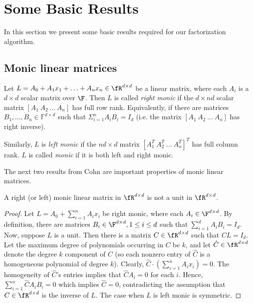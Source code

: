 \section{Some Basic Results}\label{bas-res-sec}

In this section we present some basic results required for our
factorization algorithm.


%

\subsection*{Monic linear matrices}

\begin{definition}\label{def-monic}{\rm\cite{Cohnfir}}
Let $L=A_0+A_1x_1+ \ldots + A_nx_n\in\fR^{d\times d}$ be a linear
matrix, where each $A_i$ is a $d\times d$ scalar matrix over
$\F$. Then $L$ is called \emph{right monic} if the $d\times nd$ scalar
matrix $[A_1~A_2~\ldots~A_n]$ has full row rank. Equivalently, if
there are matrices $B_1, \ldots, B_n \in \mathbb{F}^{d \times d}$ such
that $\Sigma_{i=1}^n A_iB_i = I_d$ (i.e. the matrix
$[A_1~A_2~\ldots~A_n]$ has right inverse).

Similarly, $L$ is \emph{left monic} if the $nd\times d$ matrix $[A_1^T~A_2^T~\ldots~A_n^T]^T$ 
has full column rank. $L$ is called \emph{monic} if it is
both left and right monic.

%
%
%
%
%
%
%
%
\end{definition}

The next two results from Cohn \cite{Cohnfir} are important properties
of monic linear matrices.

\begin{lemma}\label{monic-nonunit}{\rm\cite{Cohnfir}}
A right (or left) monic linear matrix in $\fR^{d\times d}$ is not a unit in
$\fR^{d\times d}$.
\end{lemma}

\begin{proof}
Let $L=A_0 + \sum_{i=1}^n A_i x_i$ be right monic, where each $A_i\in
\F^{d\times d}$. By definition, there are matrices $B_i\in\F^{d\times
  d}, 1\le i\le d$ such that $\sum_{i=1}^d A_iB_i=I_d$. Now, suppose
$L$ is a unit. Then there is a matrix $C\in\fR^{d\times d}$ such that
$CL=I_d$. Let the maximum degree of polynomials occurring in $C$ be
$k$, and let $\hat{C}\in\fR^{d\times d}$ denote the degree $k$
component of $C$ (so each nonzero entry of $\hat{C}$ is a homogeneous
polynomial of degree $k$). Clearly, $\hat{C}\cdot (\sum_{i=1}^n A_i
x_i)=0$. The homogeneity of $\hat{C}$'s entries implies that $\hat{C}
A_i=0$ for each $i$. Hence, $\sum_{i=1}^n \hat{C}A_i B_i =0$ which
implies $\hat{C}=0$, contradicting the assumption that
$C\in\fR^{d\times d}$ is the inverse of $L$. The case when $L$ is left
monic is symmetric.
\end{proof}


